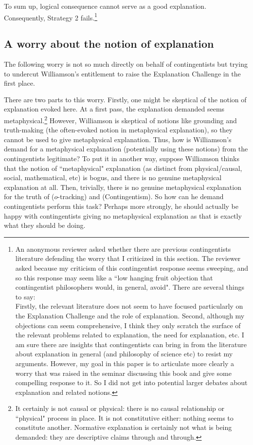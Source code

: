 To sum up, logical consequence cannot serve as a good explanation. Consequently, Strategy 2 fails.\footnote{An anonymous reviewer asked whether there are previous contingentists literature defending the worry that I criticized in this section. The reviewer asked because my criticism of this contingentist response seems sweeping, and so this response may seem like a ``low hanging fruit objection that contingentist philosophers would, in general, avoid". There are several things to say: \\
Firstly, the relevant literature does not seem to have focused particularly on the Explanation Challenge and the role of explanation. 
Second, although my objections can seem comprehensive, I think they only scratch the surface of the relevant problems related to explanation, the need for explanation, etc. I am sure there are insights that contingentists can bring in from the literature about explanation in general (and philosophy of science etc) to resist my arguments. However, my goal in this paper is to articulate more clearly a worry that was raised in the seminar discussing this book and give some compelling response to it. So I did not get into potential larger debates about explanation and related notions.}

\subsection{A worry about the notion of explanation}
The following worry is not so much directly on behalf of contingentists but trying to undercut Williamson's entitlement to raise the Explanation Challenge in the first place. 

There are two parts to this worry. 
Firstly, one might be skeptical of the notion of explanation evoked here. At a first pass, the explanation demanded seems metaphysical.\footnote{It certainly is not causal or physical: there is no causal relationship or ``physical" process in place. It is not constitutive either: nothing seems to constitute another. Normative explanation is certainly not what is being demanded: they are descriptive claims through and through.} However, Williamson is skeptical of notions like grounding and truth-making (the often-evoked notion in metaphysical explanation), so they cannot be used to give metaphysical explanation. Thus, how is Williamson's demand for a metaphysical explanation (potentially using these notions) from the contingentists legitimate? To put it in another way, suppose Williamson thinks that the notion of ``metaphysical" explanation (as distinct from physical/causal, social, mathematical, etc) is bogus, and there is no genuine metaphysical explanation at all. Then, trivially, there is no genuine metaphysical explanation for the truth of ($o$-tracking) and (Contingentism). So how can he demand contingentists perform this task? Perhaps more strongly, he should actually be happy with contingentists giving no metaphysical explanation as that is exactly what they should be doing. 

